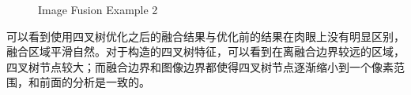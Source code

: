 \documentclass[UTF8, onecolumn, a4paper]{article}
\begin{document}
\begin{figure}[H]
	\caption{Image Fusion Example 2}
	\label{fig:Fusion2}
\end{figure}

可以看到使用四叉树优化之后的融合结果与优化前的结果在肉眼上没有明显区别，融合区域平滑自然。对于构造的四叉树特征，可以看到在离融合边界较远的区域，四叉树节点较大；而融合边界和图像边界都使得四叉树节点逐渐缩小到一个像素范围，和前面的分析是一致的。
\end{document}
